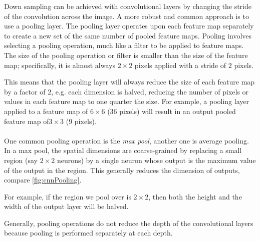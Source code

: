 Down sampling can be achieved with convolutional layers by changing the stride of the convolution across the image. A more robust and common approach is to use a pooling layer.
The pooling layer operates upon each feature map separately to create a new set of the same number of pooled feature maps.
Pooling involves selecting a pooling operation, much like a filter to be applied to feature maps. The size of the pooling operation or filter is smaller than the size of the feature map; specifically, it is almost always $2×2$ pixels applied with a stride of $2$ pixels.

This means that the pooling layer will always reduce the size of each feature map by a factor of $2$, e.g. each dimension is halved, reducing the number of pixels or values in each feature map to one quarter the size. For example, a pooling layer applied to a feature map of $6×6$ ($36$ pixels) will result in an output pooled feature map of$ 3×3$ ($9$ pixels). 
\\
\\
One common pooling operation is the \emph{max pool}, another one is average pooling. In a max pool, the spatial dimensions are coarse-grained by replacing a small region (say $2\times 2$ neurons) by a single neuron whose output is the maximum value of the output in the region. This generally reduces the dimension of outputs, compare \ref{fig:cnnPooling}.
\begin{example}
	For example, if the region we pool over is $2\times 2$, then both the height and the width of the output layer will be halved. 
\end{example}
Generally, pooling operations do not reduce the depth of the convolutional layers because pooling is performed separately at each depth.
